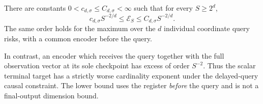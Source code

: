 \begin{theorem}\label{thm:v9-delayed}
There are constants $0<c_{d,\sigma}\le C_{d,\sigma}<\infty$ such that
for every $S\ge2^d$,
\begin{equation}
             c_{d,\sigma}S^{-2/d}\le\mathcal E_S
                          \le C_{d,\sigma}S^{-2/d}.
 \label{eq:v9-delayedrate}
\end{equation}
The same order holds for the maximum over the $d$ individual coordinate
query risks, with a common encoder before the query.

In contrast, an encoder which receives the query together with the full
observation vector at its sole checkpoint has excess of order $S^{-2}$.
Thus the scalar terminal target has a strictly worse cardinality
exponent under the delayed-query causal constraint. The lower bound
uses the register \emph{before} the query and is not a final-output
dimension bound.
\end{theorem}
